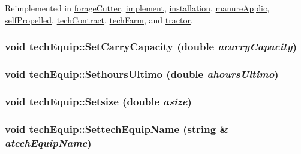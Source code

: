 Reimplemented in \hyperlink{classforage_cutter_af767727457025f83e708de8838a7beed}{forageCutter}, \hyperlink{classimplement_ab15a9401469890f3bd902bb007009957}{implement}, \hyperlink{classinstallation_ad006ec668a0ec601c610380cffe6e86b}{installation}, \hyperlink{classmanure_applic_abd655046e002e2da34a796b45f0597e2}{manureApplic}, \hyperlink{classself_propelled_a13e862db150a5804947fe838384529df}{selfPropelled}, \hyperlink{classtech_contract_ae2669826bdb3931c603d00e288011fff}{techContract}, \hyperlink{classtech_farm_aa64882b3e2248295d793274f75795707}{techFarm}, and \hyperlink{classtractor_aeb535e7ae93c012609c660369ed23f3c}{tractor}.\hypertarget{classtech_equip_a4d3ba991907cd0a57ad5fb8770152874}{
\subsubsection[{SetCarryCapacity}]{\setlength{\rightskip}{0pt plus 5cm}void techEquip::SetCarryCapacity (double {\em acarryCapacity})}}
\label{classtech_equip_a4d3ba991907cd0a57ad5fb8770152874}
\hypertarget{classtech_equip_a3bdac847c7f243a4603fb9569c9b264e}{
\subsubsection[{SethoursUltimo}]{\setlength{\rightskip}{0pt plus 5cm}void techEquip::SethoursUltimo (double {\em ahoursUltimo})}}
\label{classtech_equip_a3bdac847c7f243a4603fb9569c9b264e}
\hypertarget{classtech_equip_acd8e16736cfa57ee38bee4d9dad7e9de}{
\subsubsection[{Setsize}]{\setlength{\rightskip}{0pt plus 5cm}void techEquip::Setsize (double {\em asize})}}
\label{classtech_equip_acd8e16736cfa57ee38bee4d9dad7e9de}
\hypertarget{classtech_equip_a9593d2ee5545ea9157b43f5671c969b3}{
\subsubsection[{SettechEquipName}]{\setlength{\rightskip}{0pt plus 5cm}void techEquip::SettechEquipName (string \& {\em atechEquipName})}}
